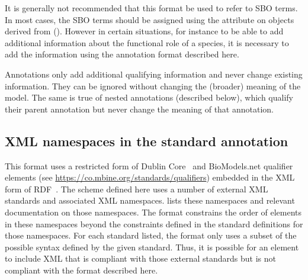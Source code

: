 It is generally not recommended that this format be used to refer
to SBO terms.  In most cases, the SBO terms should be assigned
using the attribute  on objects derived from \SBase
().  However in certain situations, for
instance to be able to add additional information about the
functional role of a species, it is necessary to add the
information using the annotation format described here.

Annotations only add additional qualifying information and never change existing information.  They can be ignored without changing the (broader) meaning of the model.  The same is true of nested annotations (described below), which qualify their parent annotation but never change the meaning of that annotation.


\subsection{XML namespaces in the standard annotation}

This format uses a restricted form of Dublin
Core~\citep{DCMI:2003} and BioModels.net qualifier elements (see
\url{https://co.mbine.org/standards/qualifiers}) embedded in the XML form
of RDF~\citep{w3c:2004}.  The scheme defined here uses a number of
external XML standards and associated XML namespaces.
 lists these
namespaces and relevant documentation on those namespaces.  The
format constrains the order of elements in these namespaces beyond
the constraints defined in the standard definitions for those
namespaces.  For each standard listed, the format only uses a
subset of the possible syntax defined by the given standard.
Thus, it is possible for an  element to include
XML that is compliant with those external standards but is not
compliant with the format described here.

